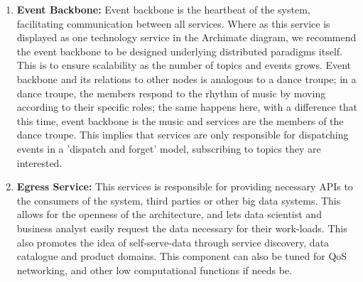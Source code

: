 \documentclass[runningheads]{llncs}
\begin{document}
\begin{enumerate}
    \item \textbf{Event Backbone:} Event backbone is the heartbeat of the system, facilitating communication between all services. Where as this service is displayed as one technology service in the Archimate diagram, we recommend the event backbone to be designed underlying distributed paradigms itself. This is to ensure scalability as the number of topics and events grows. Event backbone and its relations to other nodes is analogous to a dance troupe; in a dance troupe, the members respond to the rhythm of music by moving according to their specific roles; the same happens here, with a difference that this time, event backbone is the music and services are the members of the dance troupe. This implies that services are only responsible for dispatching events in a 'dispatch and forget' model, subscribing to topics they are interested. 
    
    \item \textbf{Egress Service:} This services is responsible for providing necessary APIs to the consumers of the system, third parties or other big data systems. This allows for the openness of the architecture, and lets data scientist and business analyst easily request the data necessary for their work-loads. This also promotes the idea of self-serve-data through service discovery, data catalogue and product domains. This component can also be tuned for QoS networking, and other low computational functions if needs be.
    

\end{enumerate}
\end{document}
